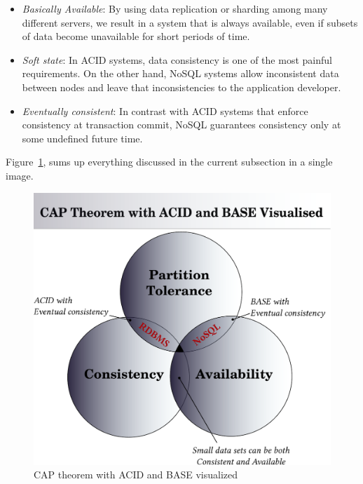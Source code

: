 \begin{description}
    \begin{itemize}
      \item \emph{Basically Available}: By using data replication or sharding
            among many different servers, we result in a system that is always
            available, even if subsets of data become unavailable for short
            periods of time.
      \item \emph{Soft state}: In ACID systems, data consistency is one of the
            most painful requirements. On the other hand, NoSQL systems allow
            inconsistent data between nodes and leave that inconsistencies to
            the application developer.
      \item \emph{Eventually consistent}: In contrast with ACID systems that
            enforce consistency at transaction commit, NoSQL guarantees
            consistency only at some undefined future time.
    \end{itemize}

    Figure~\ref{fig:cap}, sums up everything discussed in the current subsection
    in a single image.

    \begin{figure}[htbp]
      \begin{center}
        \includegraphics[width=0.8\maxwidth]{../figures/cap-nist.pdf}
        \caption{CAP theorem with ACID and BASE visualized\label{fig:cap}}
       \end{center}
    \end{figure}
\end{description}

